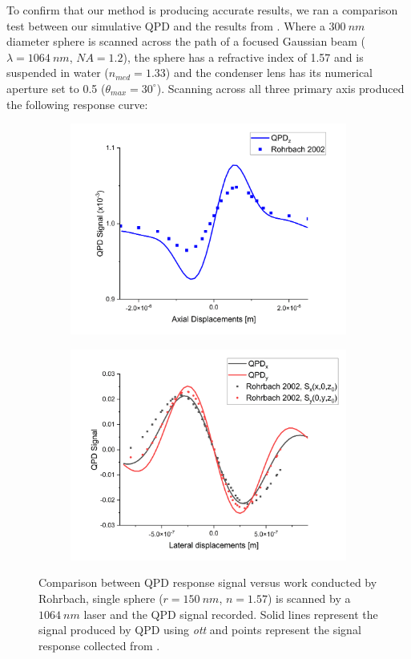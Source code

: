 To confirm that our method is producing accurate results, we ran a
comparison test between our simulative QPD and the results from \cite{Rohrbach2002}. Where a $300\ nm$ diameter sphere is scanned 
across the path of a focused Gaussian beam ($\lambda=1064\ nm$, $NA=1.2$), the sphere has a refractive index of 1.57 and is suspended in water ($n_{med}=1.33$) and the condenser lens has its numerical aperture
set to 0.5 ($\theta_{max} = 30^\circ$). Scanning across all three primary axis produced the following response curve:
\begin{figure}[h!]
	\begin{subfigure}{0.475 \linewidth}
		\subcaption{}
		\includegraphics[width=\linewidth]{QPD_axial_tests.png}
	\end{subfigure}
	\begin{subfigure}{0.475 \linewidth}
		\subcaption{}
		\includegraphics[width=\linewidth]{QPD_lat_tests.png}
	\end{subfigure}
	\caption{Comparison between QPD response signal versus work conducted by 
		Rohrbach, single sphere ($r = 150\ nm$, $n=1.57$) is scanned by a $1064\ nm$ laser and the QPD signal recorded. Solid lines represent the signal produced by QPD using \textit{ott} and points represent the signal response collected from \cite{Rohrbach2002}.}
	\label{fig:Rohrbach}
\end{figure}

